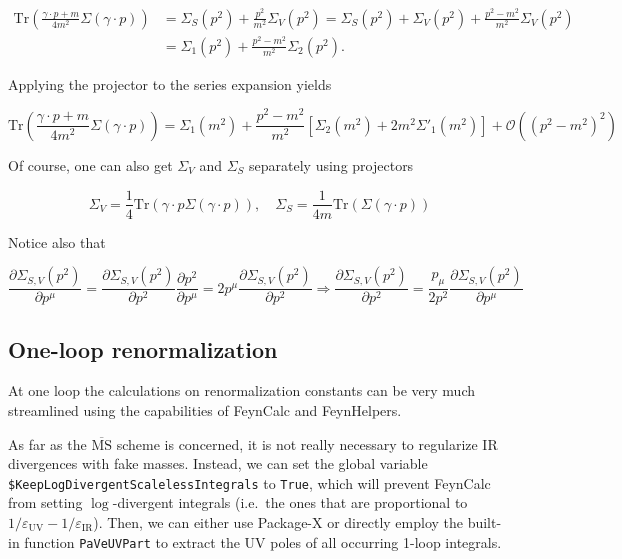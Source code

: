 \documentclass[../FeynCalcManual.tex]{subfiles}
\begin{document}
\begin{align*}
\mathrm{Tr} \left( \frac{\gamma \cdot p+m}{4m^2} \Sigma (\gamma \cdot p) \right ) & = \Sigma_S (p^2) + \frac{p^2}{m^2} \Sigma_V(p^2) = \Sigma_S (p^2) + \Sigma_V(p^2) + \frac{p^2-m^2}{m^2} \Sigma_V(p^2) \\
    &  = \Sigma_1 (p^2) + \frac{p^2-m^2}{m^2} \Sigma_2(p^2).
\end{align*}

Applying the projector to the series expansion yields

\begin{equation}
    \mathrm{Tr} \left( \frac{\gamma \cdot p+m}{4m^2} \Sigma (\gamma \cdot p) \right )  = \Sigma_1(m^2) +
    \frac{p^2-m^2}{m^2}  \left [ \Sigma_2(m^2) + 2 m^2 \Sigma'_1 (m^2)  \right ] + \mathcal{O}((p^2 -m^2)^2)
\end{equation}

Of course, one can also get \(\Sigma_V\) and \(\Sigma_S\) separately
using projectors

\begin{equation}
\Sigma_V = \frac{1}{4} \mathrm{Tr}(\gamma \cdot p \Sigma (\gamma \cdot p)), \quad \Sigma_S = \frac{1}{4 m} \mathrm{Tr}(\Sigma (\gamma \cdot p))
\end{equation}

Notice also that

\begin{equation}
 \frac{\partial \Sigma_{S,V}(p^2)}{\partial p^\mu} = \frac{\partial \Sigma_{S,V}(p^2)}{\partial p^2} \frac{\partial p^2}{\partial p^\mu} = 2 p^\mu \frac{\partial \Sigma_{S,V}(p^2)}{\partial p^2} \Rightarrow 
  \frac{\partial \Sigma_{S,V}(p^2)}{\partial p^2} = \frac{p_\mu}{2 p^2 } \frac{\partial \Sigma_{S,V}(p^2)}{\partial p^\mu}
\end{equation}

\subsection{One-loop renormalization}\label{one-loop-renormalization}

At one loop the calculations on renormalization constants can be very
much streamlined using the capabilities of FeynCalc and FeynHelpers.

As far as the \(\overline{\textrm{MS}}\) scheme is concerned, it is not
really necessary to regularize IR divergences with fake masses. Instead,
we can set the global variable
\texttt{\$KeepLogDivergentScalelessIntegrals} to \texttt{True}, which
will prevent FeynCalc from setting \(\log\)-divergent integrals
(i.e.~the ones that are proportional to
\(1/\varepsilon_{\textrm{UV}} - 1/\varepsilon_{\textrm{IR}}\)). Then, we
can either use Package-X or directly employ the built-in function
\texttt{PaVeUVPart} to extract the UV poles of all occurring 1-loop
integrals.
\end{document}
